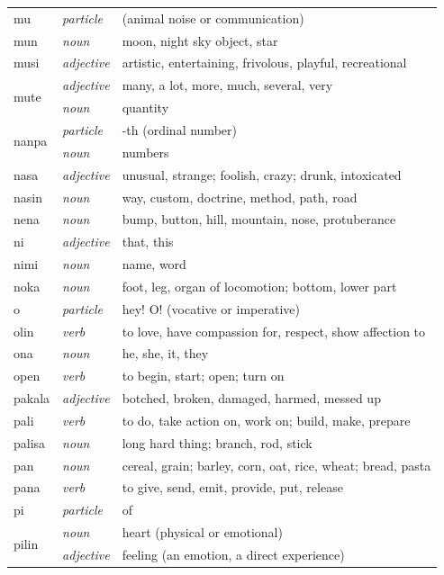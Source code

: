\documentclass[14pt, a4paper]{extreport}
\begin{document}
\begin{longtable}{llp{10cm}}
  mu & \textit{particle} & (animal noise or communication) \\
  mun & \textit{noun} & moon, night sky object, star \\
  musi & \textit{adjective} & artistic, entertaining, frivolous, playful, recreational \\
  \multirow[t]{2}{*}{mute} & \textit{adjective} & many, a lot, more, much, several, very \\
  & \textit{noun} & quantity \\
  \multirow[t]{2}{*}{nanpa} & \textit{particle} & -th (ordinal number) \\
  & \textit{noun} & numbers \\
  nasa & \textit{adjective} & unusual, strange; foolish, crazy; drunk, intoxicated \\
  nasin & \textit{noun} & way, custom, doctrine, method, path, road \\
  nena & \textit{noun} & bump, button, hill, mountain, nose, protuberance \\
  ni & \textit{adjective} & that, this \\
  nimi & \textit{noun} & name, word \\
  noka & \textit{noun} & foot, leg, organ of locomotion; bottom, lower part \\
  o & \textit{particle} & hey! O! (vocative or imperative) \\
  olin & \textit{verb} & to love, have compassion for, respect, show affection to \\
  ona & \textit{noun} & he, she, it, they \\
  open & \textit{verb} & to begin, start; open; turn on \\
  pakala & \textit{adjective} & botched, broken, damaged, harmed, messed up \\
  pali & \textit{verb} & to do, take action on, work on; build, make, prepare \\
  palisa & \textit{noun} & long hard thing; branch, rod, stick \\
  pan & \textit{noun} & cereal, grain; barley, corn, oat, rice, wheat; bread, pasta \\
  pana & \textit{verb} & to give, send, emit, provide, put, release \\
  pi & \textit{particle} & of \\
  \multirow[t]{2}{*}{pilin} & \textit{noun} & heart (physical or emotional) \\
  & \textit{adjective} & feeling (an emotion, a direct experience) \\

\end{longtable}
\end{document}

